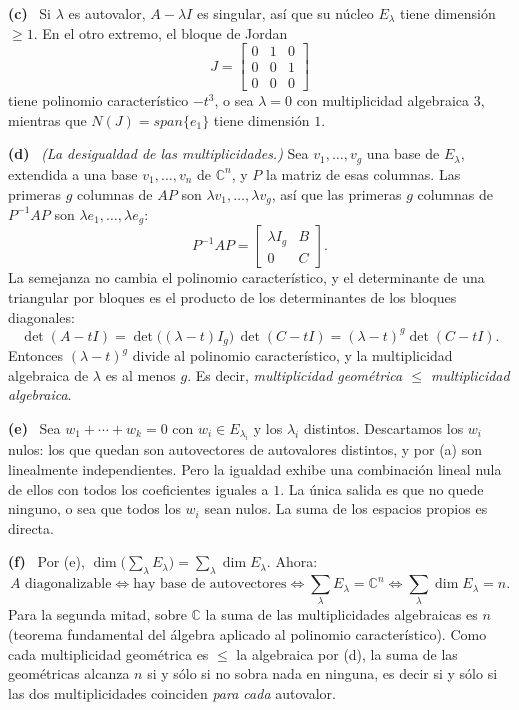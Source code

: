 \documentclass[11pt,a4paper]{article}
\newcommand{\bi}[1]{\boldsymbol{#1}}
\newcommand{\n}[1]{\boldsymbol{#1}}
\newcommand{\Cx}{\mathbb{C}}
\DeclareMathOperator{\gen}{span}
\DeclareMathOperator{\tr}{tr}
\DeclareMathOperator{\rg}{rg}
\def\n#1{#1}\def\bi#1{#1}\def\rg{rg}\def\tr{tr}\def\gen{span}%
\newcommand{\itemsol}[1]{\par\medskip\noindent\textbf{(#1)}\ \ignorespaces}
\begin{document}
\itemsol{c} Si $\lambda$ es autovalor, $A-\lambda I$ es singular, así que su
núcleo $E_\lambda$ tiene dimensión $\ge1$. En el otro extremo, el bloque de
Jordan
\[
J=\begin{bmatrix}0&1&0\\ 0&0&1\\ 0&0&0\end{bmatrix}
\]
tiene polinomio característico $-t^3$, o sea $\lambda=0$ con multiplicidad
algebraica $3$, mientras que $N(J)=\gen\{\bi{e}_1\}$ tiene dimensión $1$.

\itemsol{d} \emph{(La desigualdad de las multiplicidades.)} Sea
$\n v_1,\dots,\n v_g$ una base de $E_\lambda$, extendida a una base
$\n v_1,\dots,\n v_n$ de $\Cx^n$, y $P$ la matriz de esas columnas. Las primeras
$g$ columnas de $AP$ son $\lambda\n v_1,\dots,\lambda\n v_g$, así que las
primeras $g$ columnas de $P^{-1}AP$ son $\lambda\bi{e}_1,\dots,\lambda\bi{e}_g$:
\[
P^{-1}AP=\begin{bmatrix}\lambda I_g & B\\ 0 & C\end{bmatrix}.
\]
La semejanza no cambia el polinomio característico, y el determinante de una
triangular por bloques es el producto de los determinantes de los bloques
diagonales:
\[
\det(A-tI)=\det\big((\lambda-t)I_g\big)\,\det(C-tI)=(\lambda-t)^{g}\det(C-tI).
\]
Entonces $(\lambda-t)^g$ divide al polinomio característico, y la multiplicidad
algebraica de $\lambda$ es al menos $g$. Es decir, \emph{multiplicidad
geométrica $\le$ multiplicidad algebraica}.

\itemsol{e} Sea $\n w_1+\cdots+\n w_k=\n0$ con $\n w_i\in E_{\lambda_i}$ y los
$\lambda_i$ distintos. Descartamos los $\n w_i$ nulos: los que quedan son
autovectores de autovalores distintos, y por (a) son linealmente independientes.
Pero la igualdad exhibe una combinación lineal nula de ellos con todos los
coeficientes iguales a $1$. La única salida es que no quede ninguno, o sea que
todos los $\n w_i$ sean nulos. La suma de los espacios propios es directa.

\itemsol{f} Por (e), $\dim\big(\sum_\lambda E_\lambda\big)=\sum_\lambda\dim E_\lambda$.
Ahora:
\[
A\text{ diagonalizable}\iff
\text{hay base de autovectores}\iff
\sum_\lambda E_\lambda=\Cx^n\iff
\sum_\lambda\dim E_\lambda=n .
\]
Para la segunda mitad, sobre $\Cx$ la suma de las multiplicidades algebraicas es
$n$ (teorema fundamental del álgebra aplicado al polinomio característico). Como
cada multiplicidad geométrica es $\le$ la algebraica por (d), la suma de las
geométricas alcanza $n$ si y sólo si no sobra nada en ninguna, es decir si y
sólo si las dos multiplicidades coinciden \emph{para cada} autovalor.
\end{document}
